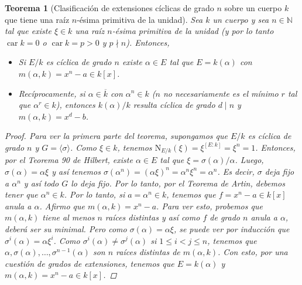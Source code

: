 \documentclass[12pt]{book}
\newtheorem{teo}{Teorema}[section]
\theoremstyle{definition}
\newcommand{\NN}{\mathbb{N}}
\DeclareMathOperator{\car}{car}
\begin{document}
\begin{teo}[Clasificación de extensiones cíclicas de grado $n$ sobre un cuerpo $k$ que tiene una raíz $n$-ésima primitiva de la unidad]
Sea $k$ un cuerpo y sea $n\in\NN$ tal que existe $\xi\in k$ una raíz $n$-ésima primitiva de la unidad (y por lo tanto $\car k=0$ o $\car k =p>0$ y $p\nmid n$). Entonces, \begin{itemize}\item Si $E/k$ es cíclica de grado $n$ existe $\alpha\in E$ tal que $E=k(\alpha)$ con $m(\alpha,k)=x^n - a\in k[x]$. \item Recíprocamente, si $\alpha\in\overline{k}$ con $\alpha^n\in k$ ($n$ no necesariamente es el mínimo $r$ tal que $\alpha^r\in k$), entonces $k(\alpha)/k$ resulta cíclica de grado $d\mid n$ y $m(\alpha,k)=x^d - b$.\end{itemize}
\begin{proof}
Para ver la primera parte del teorema, supongamos que $E/k$ es cíclica de grado $n$ y $G=\langle\sigma\rangle$. Como $\xi\in k$, tenemos $\mathrm{N}_{E/k}(\xi) = \xi^{[E:k]} = \xi^n = 1$. Entonces, por el Teorema 90 de Hilbert, existe $\alpha\in E$ tal que $\xi = \sigma(\alpha)/\alpha$. Luego, $\sigma(\alpha)=\alpha\xi$ y así tenemos $\sigma(\alpha^n) = (\alpha\xi)^n = \alpha^n \xi^n = \alpha^n$. Es decir, $\sigma$ deja fijo a $\alpha^n$ y así todo $G$ lo deja fijo. Por lo tanto, por el Teorema de Artin, debemos tener que $\alpha^n\in k$. Por lo tanto, si $a=\alpha^n\in k$, tenemos que $f=x^n - a\in k[x]$ anula a $\alpha$. Afirmo que $m(\alpha,k) = x^n - a$. Para ver esto, probemos que $m(\alpha,k)$ tiene al menos $n$ raíces distintas y así como $f$ de grado $n$ anula a $\alpha$, deberá ser su minimal. Pero como $\sigma(\alpha)=\alpha\xi$, se puede ver por inducción que $\sigma^i(\alpha)=\alpha\xi^i$. Como $\sigma^i(\alpha)\neq\sigma^j(\alpha)$ si $1\leq i < j \leq n$, tenemos que $\alpha,\sigma(\alpha),\ldots , \sigma^{n-1}(\alpha)$ son $n$ raíces distintas de $m(\alpha,k)$. Con esto, por una cuestión de grados de extensiones, tenemos que $E=k(\alpha)$ y $m(\alpha,k)=x^n - a\in k[x]$.


\end{proof}
\end{teo}
\end{document}
